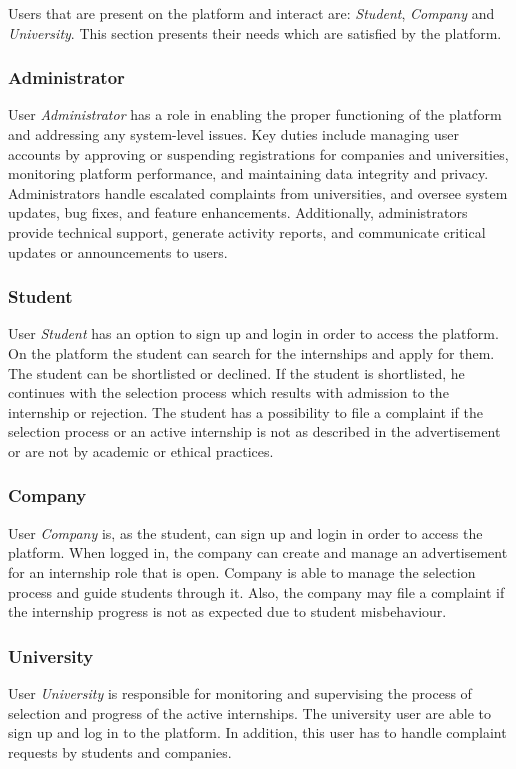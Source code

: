 Users that are present on the platform and interact are: \textit{Student}, \textit{Company} and \textit{University}. This section presents their needs which are satisfied by the platform.

\subsubsection{Administrator}
User \textit{Administrator} has a role in enabling the proper functioning of the platform and addressing any system-level issues. Key duties include managing user accounts by approving or suspending registrations for companies and universities, monitoring platform performance, and maintaining data integrity and privacy. Administrators handle escalated complaints from universities, and oversee system updates, bug fixes, and feature enhancements. Additionally, administrators provide technical support, generate activity reports, and communicate critical updates or announcements to users.


\subsubsection{Student}
User \textit{Student} has an option to sign up and login in order to access the platform. On the platform the student can search for the internships and apply for them. The student can be shortlisted or declined. If the student is shortlisted, he continues with the selection process which results with admission to the internship or rejection. The student has a possibility to file a complaint if the selection process or an active internship is not as described in the advertisement or are not by academic or ethical practices.


\subsubsection{Company}

User \textit{Company} is, as the student, can sign up and login in order to access the platform. When logged in, the company can create and manage an advertisement for an internship role that is open. Company is able to manage the selection process and guide students through it. Also, the company may file a complaint if the internship progress is not as expected due to student misbehaviour. 



\subsubsection{University}
User \textit{University} is responsible for monitoring and supervising the process of selection and progress of the active internships. The university user are able to sign up and log in to the platform. In addition, this user has to handle complaint requests by students and companies. 

